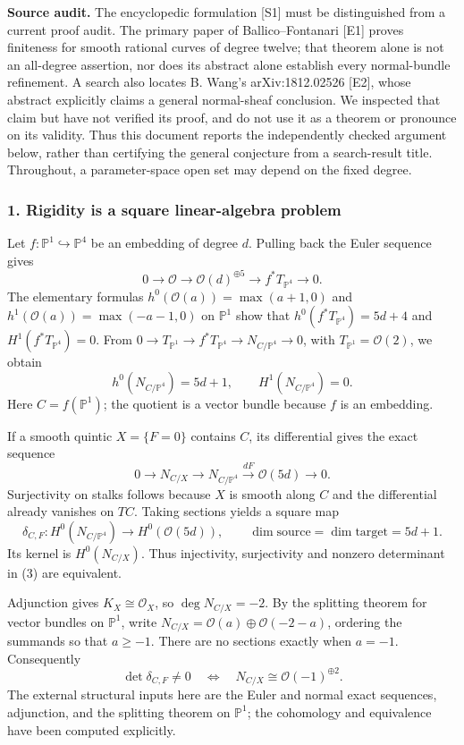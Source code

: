 \documentclass[11pt]{article}
\begin{document}
\textbf{Source audit.} The encyclopedic formulation [S1] must be distinguished from a current proof audit. The primary paper of Ballico--Fontanari [E1] proves finiteness for smooth rational curves of degree twelve; that theorem alone is not an all-degree assertion, nor does its abstract alone establish every normal-bundle refinement. A search also locates B. Wang's arXiv:1812.02526 [E2], whose abstract explicitly claims a general normal-sheaf conclusion. We inspected that claim but have not verified its proof, and do not use it as a theorem or pronounce on its validity. Thus this document reports the independently checked argument below, rather than certifying the general conjecture from a search-result title. Throughout, a parameter-space open set may depend on the fixed degree.

\subsubsection{1. Rigidity is a square linear-algebra problem}
Let $f:\mathbb P^1\hookrightarrow\mathbb P^4$ be an embedding of degree $d$. Pulling back the Euler sequence gives
\[
0\longrightarrow\mathcal O\longrightarrow\mathcal O(d)^{\oplus5}
\longrightarrow f^*T_{\mathbb P^4}\longrightarrow0.
\]
The elementary formulas $h^0(\mathcal O(a))=\max(a+1,0)$ and
$h^1(\mathcal O(a))=\max(-a-1,0)$ on $\mathbb P^1$ show that
$h^0(f^*T_{\mathbb P^4})=5d+4$ and $H^1(f^*T_{\mathbb P^4})=0$.
From $0\to T_{\mathbb P^1}\to f^*T_{\mathbb P^4}\to N_{C/\mathbb P^4}\to0$, with $T_{\mathbb P^1}=\mathcal O(2)$, we obtain
\[
 h^0(N_{C/\mathbb P^4})=5d+1,\qquad H^1(N_{C/\mathbb P^4})=0. \tag{1}
\]
Here $C=f(\mathbb P^1)$; the quotient is a vector bundle because $f$ is an embedding.

If a smooth quintic $X=\{F=0\}$ contains $C$, its differential gives the exact sequence
\[
0\to N_{C/X}\to N_{C/\mathbb P^4}
 \xrightarrow{dF}\mathcal O(5d)\to0.                   \tag{2}
\]
Surjectivity on stalks follows because $X$ is smooth along $C$ and the differential already vanishes on $TC$. Taking sections yields a square map
\[
 \delta_{C,F}:H^0(N_{C/\mathbb P^4})\longrightarrow H^0(\mathcal O(5d)),
 \qquad\dim\text{source}=\dim\text{target}=5d+1.         \tag{3}
\]
Its kernel is $H^0(N_{C/X})$. Thus injectivity, surjectivity and nonzero determinant in (3) are equivalent.

Adjunction gives $K_X\cong\mathcal O_X$, so $\deg N_{C/X}=-2$.
By the splitting theorem for vector bundles on $\mathbb P^1$, write
$N_{C/X}=\mathcal O(a)\oplus\mathcal O(-2-a)$, ordering the summands so that $a\ge-1$. There are no sections exactly when $a=-1$. Consequently
\[
\det\delta_{C,F}\ne0
\quad\Longleftrightarrow\quad
N_{C/X}\cong\mathcal O(-1)^{\oplus2}.                  \tag{4}
\]
The external structural inputs here are the Euler and normal exact sequences, adjunction, and the splitting theorem on $\mathbb P^1$; the cohomology and equivalence have been computed explicitly.
\end{document}

